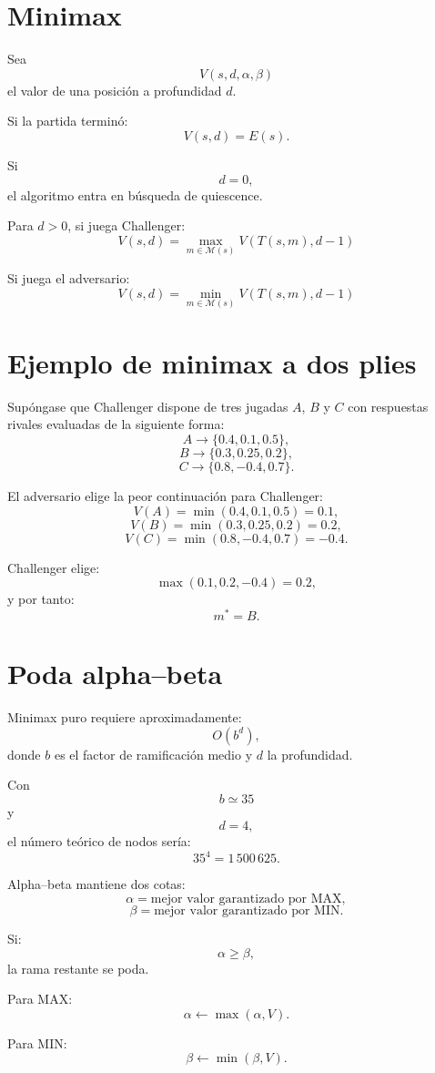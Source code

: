 \documentclass[11pt,a4paper]{article}
\begin{document}
\section{Minimax}

Sea
\[
V(s,d,\alpha,\beta)
\]
el valor de una posición a profundidad $d$.

Si la partida terminó:
\[
V(s,d)=E(s).
\]

Si
\[
d=0,
\]
el algoritmo entra en búsqueda de quiescence.

Para $d>0$, si juega Challenger:
\[
\boxed{
V(s,d)=
\max_{m\in\mathcal M(s)}
V(T(s,m),d-1)
}
\]

Si juega el adversario:
\[
\boxed{
V(s,d)=
\min_{m\in\mathcal M(s)}
V(T(s,m),d-1)
}
\]

\section{Ejemplo de minimax a dos plies}

Supóngase que Challenger dispone de tres jugadas $A$, $B$ y $C$ con respuestas
rivales evaluadas de la siguiente forma:
\[
A\rightarrow\{0.4,0.1,0.5\},
\]
\[
B\rightarrow\{0.3,0.25,0.2\},
\]
\[
C\rightarrow\{0.8,-0.4,0.7\}.
\]

El adversario elige la peor continuación para Challenger:
\[
V(A)=\min(0.4,0.1,0.5)=0.1,
\]
\[
V(B)=\min(0.3,0.25,0.2)=0.2,
\]
\[
V(C)=\min(0.8,-0.4,0.7)=-0.4.
\]

Challenger elige:
\[
\max(0.1,0.2,-0.4)=0.2,
\]
y por tanto:
\[
\boxed{m^\ast=B}.
\]

\section{Poda alpha--beta}

Minimax puro requiere aproximadamente:
\[
O(b^d),
\]
donde $b$ es el factor de ramificación medio y $d$ la profundidad.

Con
\[
b\simeq35
\]
y
\[
d=4,
\]
el número teórico de nodos sería:
\[
35^4=1\,500\,625.
\]

Alpha--beta mantiene dos cotas:
\[
\alpha=
\text{mejor valor garantizado por MAX},
\]
\[
\beta=
\text{mejor valor garantizado por MIN}.
\]

Si:
\[
\boxed{\alpha\ge\beta},
\]
la rama restante se poda.

Para MAX:
\[
\alpha\leftarrow\max(\alpha,V).
\]

Para MIN:
\[
\beta\leftarrow\min(\beta,V).
\]
\end{document}
